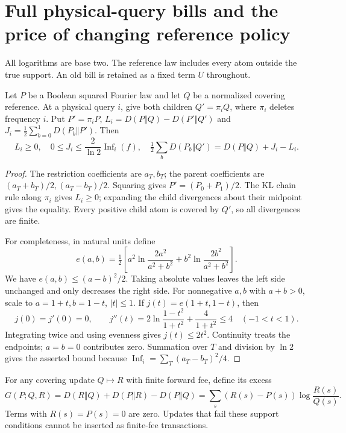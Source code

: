 \section{Full physical-query bills and the price of changing reference policy}
\label{sec:v12}
All logarithms are base two. The reference law includes every atom outside the true
support. An old bill is retained as a fixed term $U$ throughout.

\begin{lemma}\label{lem:v12-query}
Let $P$ be a Boolean squared Fourier law and let $Q$ be a normalized covering reference.
At a physical query $i$, give both children $Q'=\pi_iQ$, where $\pi_i$ deletes frequency $i$.
Put $P'=\pi_iP$, $L_i=D(P\Vert Q)-D(P'\Vert Q')$ and
$J_i=\frac12\sum_{b=0}^1D(P_b\Vert P')$. Then
\[
 L_i\geq0,\quad 0\leq J_i\leq\frac2{\ln2}\operatorname{Inf}_i(f),\quad
 \tfrac12\sum_bD(P_b\Vert Q')=D(P\Vert Q)+J_i-L_i.
\]
\end{lemma}
\begin{proof}
The restriction coefficients are $a_T,b_T$; the parent coefficients are
$(a_T+b_T)/2,(a_T-b_T)/2$. Squaring gives
$P'=(P_0+P_1)/2$. The KL chain rule along $\pi_i$ gives $L_i\geq0$; expanding the
child divergences about their midpoint gives the equality. Every positive child atom
is covered by $Q'$, so all divergences are finite.

For completeness, in natural units define
\[
 e(a,b)=\tfrac12\left[a^2\ln\frac{2a^2}{a^2+b^2}
                       +b^2\ln\frac{2b^2}{a^2+b^2}\right].
\]
We have $e(a,b)\leq(a-b)^2/2$. Taking absolute values leaves the left side unchanged
and only decreases the right side. For nonnegative $a,b$ with $a+b>0$, scale to
$a=1+t,b=1-t$, $|t|\leq1$. If $j(t)=e(1+t,1-t)$, then
\[
 j(0)=j'(0)=0,\qquad
 j''(t)=2\ln\frac{1-t^2}{1+t^2}+\frac4{1+t^2}\leq4\quad(-1<t<1).
\]
Integrating twice and using evenness gives $j(t)\leq2t^2$. Continuity treats the
endpoints; $a=b=0$ contributes zero. Summation over $T$ and division by $\ln2$ gives
the asserted bound because $\operatorname{Inf}_i=\sum_T(a_T-b_T)^2/4$.
\end{proof}

For any covering update $Q\longmapsto R$ with finite forward fee, define its excess
\[
 G(P;Q,R)=D(R\Vert Q)+D(P\Vert R)-D(P\Vert Q)
          =\sum_s(R(s)-P(s))\log\frac{R(s)}{Q(s)}.
\]
Terms with $R(s)=P(s)=0$ are zero. Updates that fail these support conditions cannot
be inserted as finite-fee transactions.

